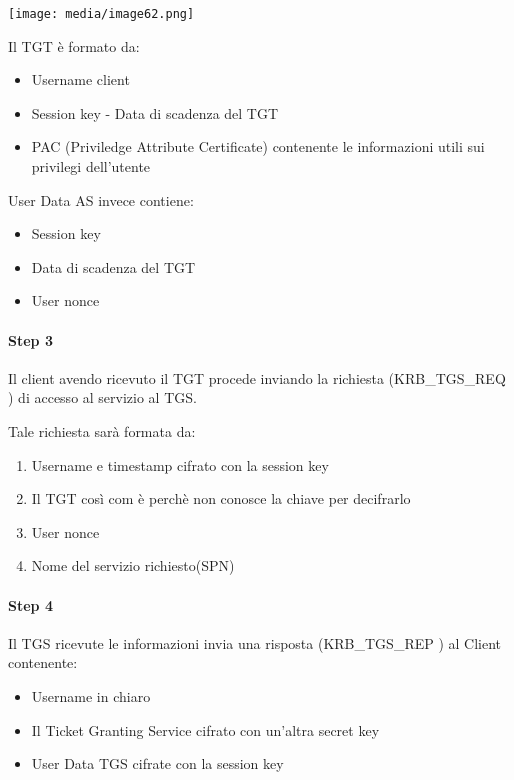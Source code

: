 \texttt{[image: media/image62.png]}

Il TGT è formato da:

\begin{itemize}
\item
  Username client
\item
  Session key - Data di scadenza del TGT
\item
  PAC (Priviledge Attribute Certificate) contenente le informazioni
  utili sui privilegi dell'utente
\end{itemize}

User Data AS invece contiene:

\begin{itemize}
\item
  Session key
\item
  Data di scadenza del TGT
\item
  User nonce
\end{itemize}

\paragraph{Step 3}\label{step-3}

Il client avendo ricevuto il TGT procede inviando la richiesta
(KRB\_TGS\_REQ ) di accesso al servizio al TGS.

Tale richiesta sarà formata da:

\begin{enumerate}
\def\labelenumi{\arabic{enumi}.}
\item
  Username e timestamp cifrato con la session key
\item
  Il TGT così com è perchè non conosce la chiave per decifrarlo
\item
  User nonce
\item
  Nome del servizio richiesto(SPN)
\end{enumerate}

\paragraph{Step 4}\label{step-4}

Il TGS ricevute le informazioni invia una risposta (KRB\_TGS\_REP ) al
Client contenente:

\begin{itemize}
\item
  Username in chiaro
\item
  Il Ticket Granting Service cifrato con un'altra secret key
\item
  User Data TGS cifrate con la session key
\end{itemize}

